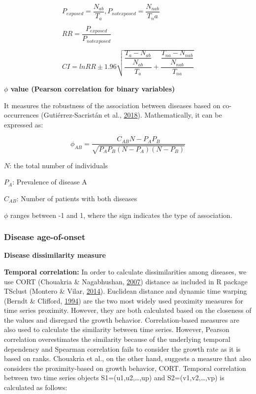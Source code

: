 \documentclass[12pt,twoside]{unicam}
\begin{document}
\begin{equation}
\begin{aligned}
    P_{exposed} = \dfrac{N_{ab}}{T_a}, P_{notexposed} = \dfrac{N_{nab}}{T_na} \\\\
    RR = \dfrac{P_{exposed}}{P_{notexposed}} \\\\
    CI = lnRR \pm 1.96 \sqrt{\dfrac{\dfrac{T_a-N_{ab}}{N_{ab}}}{T_a} + \dfrac{\dfrac{T_{na}-N_{nab}}{N_{nab}}}{T_{na}}}
  \label{eq:disRR}
\end{aligned}
\end{equation}

\textbf{\(\phi\) value (Pearson correlation for binary variables)}

It measures the robustness of the association between diseases based on co-occurrences (Gutiérrez-Sacristán et al., \protect\hyperlink{ref-Gutierrez-Sacristan2018}{2018}). Mathematically, it can be expressed as:

\begin{equation}
    \phi_{AB} = \dfrac{C_{AB}N - P_AP_B}{\sqrt{P_AP_B(N-P_A)(N-P_B)}}
  \label{eq:disphi}
\end{equation}

\(N\): the total number of individuals

\(P_{A}\): Prevalence of disease A

\(C_{AB}\): Number of patients with both diseases

\(\phi\) ranges between -1 and 1, where the sign indicates the type of association.

\hypertarget{disease-age-of-onset}{%
\subsubsection{Disease age-of-onset}\label{disease-age-of-onset}}

\textbf{Disease dissimilarity measure}

\textbf{Temporal correlation:} In order to calculate dissimilarities among diseases, we use CORT (Chouakria \& Nagabhushan, \protect\hyperlink{ref-Chouakria2007}{2007}) distance as included in R package TSclust (Montero \& Vilar, \protect\hyperlink{ref-Montero2014}{2014}). Euclidean distance and dynamic time warping (Berndt \& Clifford, \protect\hyperlink{ref-Berndt1994}{1994}) are the two most widely used proximity measures for time series proximity. However, they are both calculated based on the closeness of the values and disregard the growth behavior. Correlation-based measures are also used to calculate the similarity between time series. However, Pearson correlation overestimates the similarity because of the underlying temporal dependency and Spearman correlation fails to consider the growth rate as it is based on ranks. Chouakria et al., on the other hand, suggests a measure that also considers the proximity-based on growth behavior, CORT. Temporal correlation between two time series objects S1=(u1,u2,\ldots,up) and S2=(v1,v2,\ldots,vp) is calculated as follows:
\end{document}
